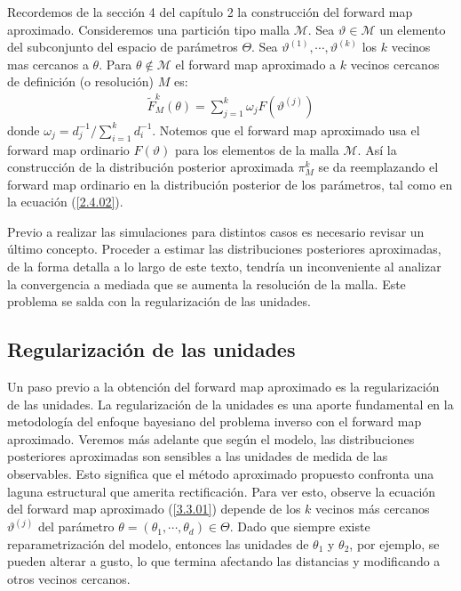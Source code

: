 Recordemos de la sección 4 del capítulo 2 la construcción del forward map aproximado. Consideremos una partición tipo malla $\mathcal{M}$. Sea $\vartheta \in \mathcal{M}$ un elemento del subconjunto del espacio de parámetros $\Theta$. Sea $\vartheta^{(1)},\cdots, \vartheta^{(k)}$ los $k$ vecinos mas cercanos a $\theta$. Para $\theta \notin \mathcal{M}$ el forward map aproximado a $k$ vecinos cercanos de definición (o resolución)  $M$ es:
\begin{align}
    \tilde{F}^{k}_M(\theta) = \sum_{j = 1}^{k} \omega_j F \left(\vartheta^{(j)}\right)
    \label{3.3.01}
\end{align}
donde $\omega_j = d_j^{-1}/ \sum_{i=1}^{k} d_i^{-1}$. Notemos que el forward map aproximado usa el forward map ordinario $F(\vartheta)$ para los elementos de la malla $\mathcal{M}$. Así la construcción de la distribución posterior aproximada $\pi_{M}^{k}$ se da reemplazando el forward map ordinario en la distribución posterior de los parámetros, tal como en la ecuación (\ref{2.4.02}).

Previo a realizar las simulaciones para distintos casos es necesario revisar un último concepto. Proceder a estimar las distribuciones posteriores aproximadas, de la forma detalla a lo largo de este texto, tendría un inconveniente al analizar la convergencia a mediada que se aumenta la resolución de la malla. Este problema se salda con la regularización de las unidades.

\subsection*{Regularización de las unidades}

Un paso previo a la obtención del forward map aproximado es la regularización de las unidades. La regularización de la unidades es una aporte fundamental en la metodología del enfoque bayesiano del problema inverso con el forward map aproximado. Veremos más adelante que según el modelo, las distribuciones posteriores aproximadas son sensibles a las unidades de medida de las observables. Esto significa que el método aproximado propuesto confronta una laguna estructural que amerita rectificación. Para ver esto, observe la ecuación del forward map aproximado (\ref{3.3.01}) depende de los $k$ vecinos más cercanos $\vartheta^{(j)}$ del parámetro $\theta =(\theta_1,\cdots,\theta_d)\in \Theta$. Dado que siempre existe reparametrización del modelo, entonces las unidades de $\theta_1$ y $\theta_2$, por ejemplo, se pueden alterar a gusto, lo que termina afectando las distancias y modificando a otros vecinos cercanos. 


